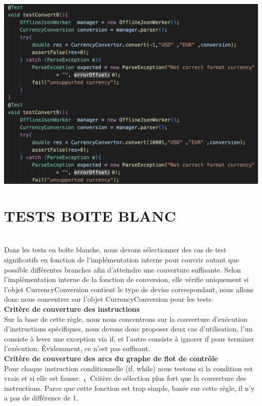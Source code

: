 \documentclass{article}
\begin{document}
\includegraphics[scale=0.3]{G5.png}\\


\section*{TESTS BOITE BLANC}\\

Dans les tests en boîte blanche, nous devons sélectionner des cas de test significatifs en fonction de l'implémentation interne pour couvrir autant que possible différentes branches afin d'atteindre une couverture suffisante. Selon l'implémentation interne de la fonction de conversion, elle vérifie uniquement si l'objet CurrencyConversion contient le type de devise correspondant, nous allons donc nous concentrer sur l'objet CurrencyConversion pour les tests.\\

\textbf{Critère de couverture des instructions}\\
Sur la base de cette règle, nous nous concentrons sur la couverture d'exécution d'instructions spécifiques, nous devons donc proposer deux cas d'utilisation, l'un consiste à lever une exception via if, et l'autre consiste à ignorer if pour terminer l'exécution. Évidemment, ce n'est pas suffisant.\\

\textbf{Critère de couverture des arcs du graphe de flot de contrôle}\\
Pour chaque instruction conditionnelle (if, while) nous testons si la condition est vraie et si elle est fausse. ，Critère de sélection plus fort que la couverture des instructions. Parce que cette fonction est trop simple, basée sur cette règle, il n'y a pas de différence de 1.\\
\end{document}
